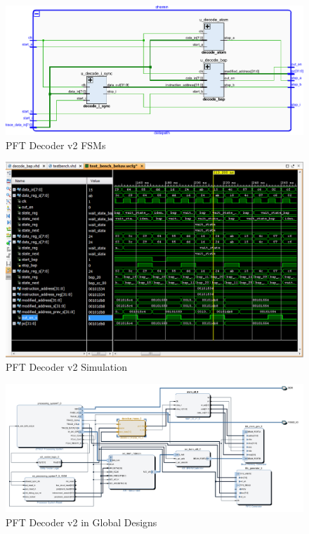 \documentclass[10pt,a4paper, oneside]{memoir}
\begin{document}
\begin{figure}
\centering
\includegraphics[scale=.85, keepaspectratio]{images/pft_decoder_v2_schematic_chemin}
\caption{PFT Decoder v2 FSMs}
\label{fig:pft_decoder_v2_schematic_chemin}
\end{figure}

\begin{figure}
\centering
\includegraphics[scale=.8, keepaspectratio]{images/pft_decoder_v2_simulation}
\caption{PFT Decoder v2 Simulation}
\label{fig:pft_decoder_v2_simulation}
\end{figure}

\begin{figure}
\centering
\includegraphics[scale=.74, keepaspectratio]{images/pft_decoder_v2_global_design}
\caption{PFT Decoder v2 in Global Designs}
\label{fig:pft_decoder_v2_global_design}
\end{figure}
\end{document}
